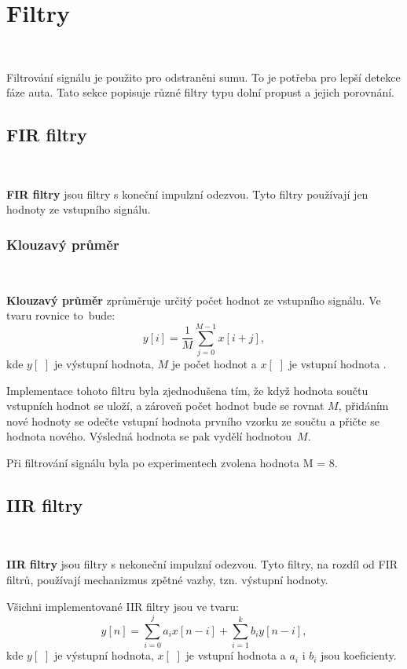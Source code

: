\chapter{Filtry}
\label{sec:Filters}
\vspace{-30pt}
\

Filtrování signálu je použito pro odstraněni sumu. To je potřeba pro lepší detekce
fáze auta. Tato sekce popisuje různé filtry typu dolní propust a jejich porovnání.

\section{FIR filtry}\

\textbf{FIR filtry} jsou filtry s koneční impulzní odezvou. Tyto filtry používají jen
hodnoty ze vstupního signálu\cite{FIR}.

\subsection{Klouzavý průměr}\

\textbf{Klouzavý průměr} zprůměruje určitý počet hodnot ze vstupního signálu.
Ve tvaru rovnice to~bude:
\begin{equation}
y[i] = \frac{1}{M}\sum_{j = 0}^{M - 1}x[i+j],
\end{equation}
kde $y[\,\,]$ je výstupní hodnota, $M$ je počet hodnot a $x[\,\,]$ je vstupní hodnota
\cite{Filters}.

Implementace tohoto filtru byla zjednodušena tím, že když hodnota součtu vstupních
hodnot se uloží, a zároveň počet hodnot bude se rovnat $M$, přidáním nové hodnoty
se odečte vstupní hodnota prvního vzorku ze součtu a přičte se hodnota nového.
Výsledná hodnota se pak vydělí hodnotou~$M$\cite{krokomer}.

Při filtrování signálu byla po experimentech zvolena hodnota M = 8.

\section{IIR filtry}\

\textbf{IIR filtry} jsou filtry s nekoneční impulzní odezvou. Tyto filtry, na rozdíl
od FIR filtrů, používají mechanizmus zpětné vazby, tzn. výstupní hodnoty\cite{IIR}.

Všichni implementované IIR filtry jsou ve tvaru:
\begin{equation}
y[n] = \sum_{i = 0}^{j}a_{i}x[n - i] + \sum_{i = 1}^{k}b_{i}y[n - i],
\end{equation}
kde $y[\,\,]$ je výstupní hodnota, $x[\,\,]$ je vstupní hodnota a $a_i$ i $b_i$
jsou koeficienty.

